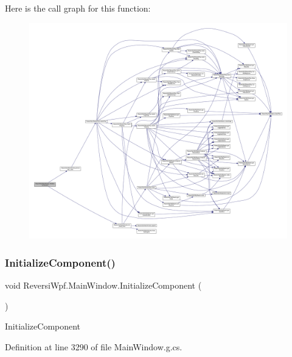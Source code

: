 Here is the call graph for this function\+:
\nopagebreak
\begin{figure}[H]
\begin{center}
\leavevmode
\includegraphics[width=350pt]{class_reversi_wpf_1_1_main_window_a4cf9bc92cee02fa8e3b00fa56fb41c82_cgraph}
\end{center}
\end{figure}
\mbox{\label{class_reversi_wpf_1_1_main_window_a4cf9bc92cee02fa8e3b00fa56fb41c82}} 
\subsubsection{\texorpdfstring{Initialize\+Component()}{InitializeComponent()}\hspace{0.1cm}{\footnotesize\ttfamily [3/4]}}
{\footnotesize\ttfamily void Reversi\+Wpf.\+Main\+Window.\+Initialize\+Component (\begin{DoxyParamCaption}{ }\end{DoxyParamCaption})}



Initialize\+Component 



Definition at line 3290 of file Main\+Window.\+g.\+cs.



